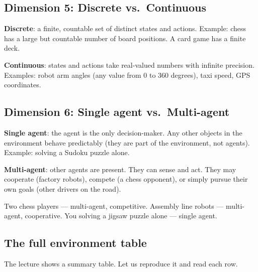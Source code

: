 \documentclass[a4paper,11pt]{article}
\newcommand{\vocab}[1]{\textbf{\color{navy}#1}}
\begin{document}
\subsection{Dimension 5: Discrete vs.\ Continuous}

\vocab{Discrete}: a finite, countable set of distinct states and actions.
Example: chess has a large but countable number of board positions. A card game
has a finite deck.

\vocab{Continuous}: states and actions take real-valued numbers with infinite
precision. Examples: robot arm angles (any value from 0 to 360 degrees), taxi
speed, GPS coordinates.

\subsection{Dimension 6: Single agent vs.\ Multi-agent}

\vocab{Single agent}: the agent is the only decision-maker. Any other objects in
the environment behave predictably (they are part of the environment, not agents).
Example: solving a Sudoku puzzle alone.

\vocab{Multi-agent}: other agents are present. They can sense and act.
They may cooperate (factory robots), compete (a chess opponent), or simply
pursue their own goals (other drivers on the road).

\begin{everyday}
Two chess players --- multi-agent, competitive. Assembly line robots --- multi-agent,
cooperative. You solving a jigsaw puzzle alone --- single agent.
\end{everyday}

\subsection{The full environment table}

The lecture shows a summary table. Let us reproduce it and read each row.
\end{document}
